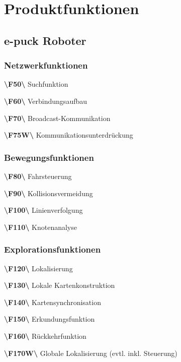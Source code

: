 \documentclass[10pt,a4paper]{article}
\begin{document}
	\section{Produktfunktionen}
		\subsection{e-puck Roboter}
			\subsubsection{Netzwerkfunktionen}
				\begin{list}{}{\leftmargin=1cm}
					\item[\textbf{\textbackslash F50\textbackslash}] Suchfunktion
					\item[\textbf{\textbackslash F60\textbackslash}] Verbindungsaufbau
					\item[\textbf{\textbackslash F70\textbackslash}] Broadcast-Kommunikation
					\item[\textbf{\textbackslash F75W\textbackslash}] Kommunikationsunterdrückung
				\end{list}
			\subsubsection{Bewegungsfunktionen}
				\begin{list}{}{\leftmargin=1cm}
					\item[\textbf{\textbackslash F80\textbackslash}] Fahrsteuerung 
					\item[\textbf{\textbackslash F90\textbackslash}] Kollisionsvermeidung
					\item[\textbf{\textbackslash F100\textbackslash}] Linienverfolgung
					\item[\textbf{\textbackslash F110\textbackslash}] Knotenanalyse
				\end{list}
			\subsubsection{Explorationsfunktionen}
				\begin{list}{}{\leftmargin=1cm}
					\item[\textbf{\textbackslash F120\textbackslash}] Lokalisierung 
					\item[\textbf{\textbackslash F130\textbackslash}] Lokale Kartenkonstruktion					
					\item[\textbf{\textbackslash F140\textbackslash}] Kartensynchronisation
					\item[\textbf{\textbackslash F150\textbackslash}] Erkundungsfunktion
					\item[\textbf{\textbackslash F160\textbackslash}] Rückkehrfunktion
					\item[\textbf{\textbackslash F170W\textbackslash}] Globale Lokalisierung (evtl. inkl. Steuerung)
				\end{list}
\end{document}
